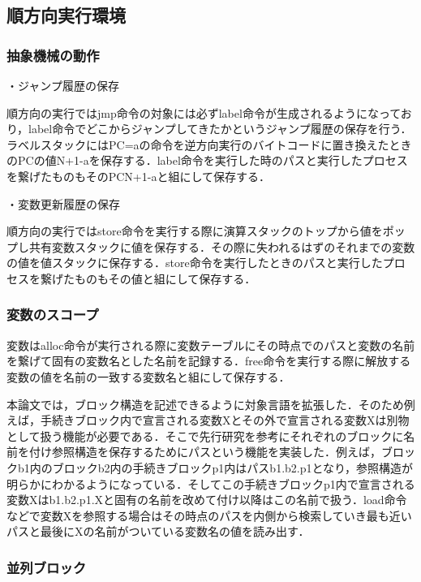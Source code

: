 \documentclass[submit,PRO]{ipsj}
\begin{document}
\subsection{順方向実行環境}

\subsubsection{抽象機械の動作}

・ジャンプ履歴の保存

順方向の実行ではjmp命令の対象には必ずlabel命令が生成されるようになっており，label命令でどこからジャンプしてきたかというジャンプ履歴の保存を行う．ラベルスタックにはPC=aの命令を逆方向実行のバイトコードに置き換えたときのPCの値N+1-aを保存する．label命令を実行した時のパスと実行したプロセスを繋げたものもそのPCN+1-aと組にして保存する．


・変数更新履歴の保存

順方向の実行ではstore命令を実行する際に演算スタックのトップから値をポップし共有変数スタックに値を保存する．その際に失われるはずのそれまでの変数の値を値スタックに保存する．store命令を実行したときのパスと実行したプロセスを繋げたものもその値と組にして保存する．

\subsubsection{変数のスコープ}

変数はalloc命令が実行される際に変数テーブルにその時点でのパスと変数の名前を繋げて固有の変数名とした名前を記録する．free命令を実行する際に解放する変数の値を名前の一致する変数名と組にして保存する．

本論文では，ブロック構造を記述できるように対象言語を拡張した．そのため例えば，手続きブロック内で宣言される変数Xとその外で宣言される変数Xは別物として扱う機能が必要である．そこで先行研究\cite{HIY18,H20}を参考にそれぞれのブロックに名前を付け参照構造を保存するためにパスという機能を実装した．例えば，ブロックb1内のブロックb2内の手続きブロックp1内はパスb1.b2.p1となり，参照構造が明らかにわかるようになっている．そしてこの手続きブロックp1内で宣言される変数Xはb1.b2.p1.Xと固有の名前を改めて付け以降はこの名前で扱う．load命令などで変数Xを参照する場合はその時点のパスを内側から検索していき最も近いパスと最後にXの名前がついている変数名の値を読み出す．


\subsubsection{並列ブロック}
\end{document}
